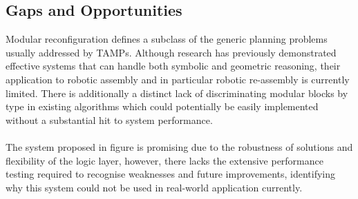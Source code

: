 \subsection{Gaps and Opportunities}
Modular reconfiguration defines a subclass of the generic planning problems usually addressed by TAMPs. Although research has previously demonstrated effective systems that can handle both symbolic and geometric reasoning, their application to robotic assembly and in particular robotic re-assembly is currently limited. There is additionally a distinct lack of discriminating modular blocks by type in existing algorithms which could potentially be easily implemented without a substantial hit to system performance.
\\\\
The system proposed in figure \cite{9438257} is promising due to the robustness of solutions and flexibility of the logic layer, however, there lacks the extensive performance testing required to recognise weaknesses and future improvements, identifying why this system could not be used in real-world application currently.

